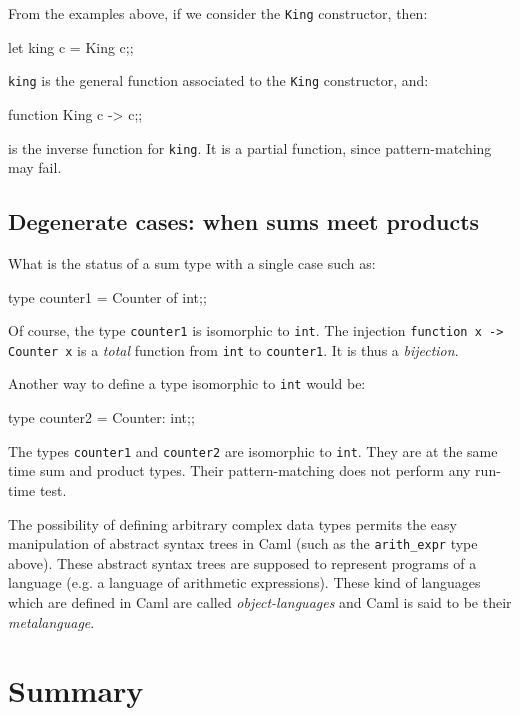 From the examples above, if we consider the {\tt King} constructor, then:
\begin{caml_example}
let king c = King c;;
\end{caml_example}
{\tt king} is the general function associated to the {\tt King}
constructor, and:
\begin{caml_example}
function King c -> c;;
\end{caml_example}
is the inverse function for {\tt king}.
It is a partial function, since pattern-matching may fail.

\subsection{Degenerate cases: when sums meet products}

What is the status of a sum type with a single case such as:
\begin{caml_example}
type counter1 = Counter of int;;
\end{caml_example}
Of course, the type {\tt counter1} is isomorphic to {\tt int}.
The injection \verb"function x -> Counter x" is a {\em total} function from {\tt int} to
{\tt counter1}. It is thus a {\em bijection}.

Another way to define a type isomorphic to {\tt int} would be:
\begin{caml_example}
type counter2 = {Counter: int};;
\end{caml_example}
The types {\tt counter1} and {\tt counter2} are isomorphic to {\tt int}.
They are at the same time sum and product types.
Their pattern-matching does not perform any run-time test.

The possibility of defining arbitrary complex data types permits the easy
manipulation of abstract syntax trees in Caml (such as the \verb"arith_expr"
type above). These abstract syntax trees are supposed to represent programs of
a language (e.g. a language of arithmetic expressions). These kind of
languages which are defined in Caml are called {\em object-languages} and
Caml is said to be their {\em metalanguage}.

\section{Summary}

